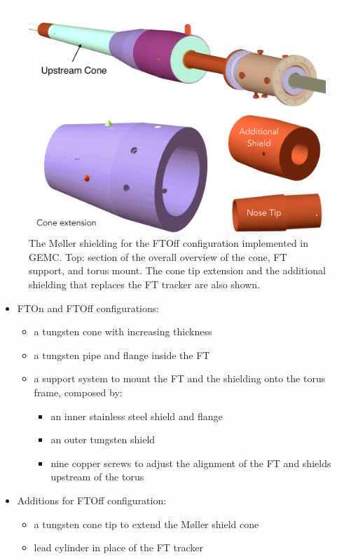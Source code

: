 \begin{figure}
	\centering
	\includegraphics[width=0.99\columnwidth,keepaspectratio]{img/moellerShieldingFTOff.png}
   \caption{The M\o ller shielding for the FTOff configuration implemented in GEMC. Top: section of the overall overview of the cone, FT support, and torus mount.
            The cone tip extension and the additional shielding that replaces the FT tracker are also shown.}
	\label{fig:moellerShieldingFTOff}
\end{figure}



\begin{itemize}
	\item FTOn and FTOff configurations:
	\begin{itemize}
		\item a tungsten cone with increasing thickness
		\item a tungsten pipe and flange inside the FT
		\item a support system to mount the FT and the shielding onto the torus frame, composed by:
		\begin{itemize}
			\item an inner stainless steel shield and flange
			\item an outer tungsten shield
			\item nine copper screws to adjust the alignment of the FT and shields upstream of the torus
		\end{itemize}
	\end{itemize}
	\item Additions for FTOff configuration:
	\begin{itemize}
	\item a tungsten cone tip to extend the M\o ller shield cone
	\item lead cylinder in place of the FT tracker
	\end{itemize}

\end{itemize}




